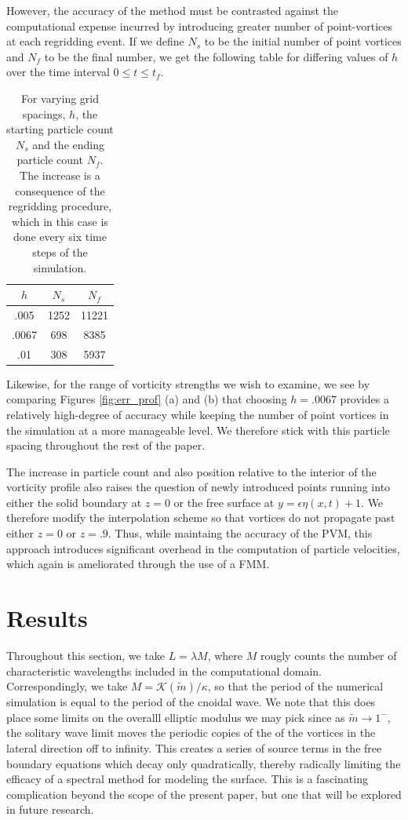 \documentclass[a4paper,11pt]{article}
\begin{document}
However, the accuracy of the method must be contrasted against the computational expense incurred by introducing greater number of point-vortices at each regridding event.  If we define $N_{s}$ to be the initial number of point vortices and $N_{f}$ to be the final number, we get the following table for differing values of $h$ over the time interval $0\leq t \leq t_{f}$.
\begin{table}
\centering
\begin{tabular}{c|cc}
$h$ & $N_{s}$ & $N_{f}$\\
\hline
.005 & 1252 & 11221\\
.0067 & 698 & 8385\\
.01 & 308 & 5937
\end{tabular}
\caption{For varying grid spacings, $h$, the starting particle count $N_{s}$ and the ending particle count $N_{f}$.  The increase is a consequence of the regridding procedure, which in this case is done every six time steps of the simulation.  }
\end{table}
Likewise, for the range of vorticity strengths we wish to examine, we see by comparing Figures \ref{fig:err_prof} (a) and (b) that choosing $h=.0067$  provides a relatively high-degree of accuracy while keeping the number of point vortices in the simulation at a more manageable level.  We therefore stick with this particle spacing throughout the rest of the paper.  

The increase in particle count and also position relative to the interior of the vorticity profile also raises the question of newly introduced points running into either the solid boundary at $z=0$ or the free surface at $y=\epsilon\eta(x,t)+1$.  We therefore modify the interpolation scheme so that vortices do not propagate past either $z=0$ or $z=.9$.    Thus, while maintaing the accuracy of the PVM, this approach introduces significant overhead in the computation of particle velocities, which again is ameliorated through the use of a FMM.  

\section{Results}
Throughout this section, we take $L = \lambda M$, where $M$ rougly counts the number of characteristic wavelengths included in the computational domain.   Correspondingly, we take $M=\mathcal{K}(\tilde{m})/\kappa$, so that the period of the numerical simulation is equal to the period of the cnoidal wave.   We note that this does place some limits on the overalll elliptic modulus we may pick since as $\tilde{m}\rightarrow 1^{-}$, the solitary wave limit moves the periodic copies of the of the vortices in the lateral direction off to infinity.  This creates a series of source terms in the free boundary equations which decay only quadratically, thereby radically limiting the efficacy of a spectral method for modeling the surface.  This is a fascinating complication beyond the scope of the present paper, but one that will be explored in future research.  
\end{document}
